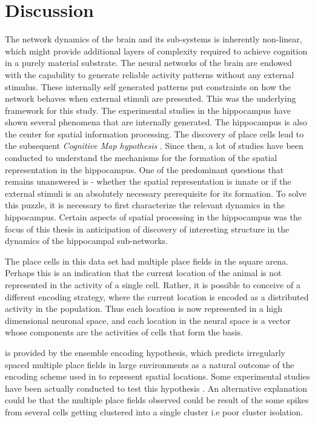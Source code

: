 \chapter{Discussion}

The network dynamics of the brain and its sub-systems is inherently non-linear, which might provide additional layers of complexity required to achieve cognition in a purely material substrate. The neural networks of the brain are endowed with the capability to generate reliable activity patterns without any external stimulus. These internally self generated patterns put constraints on how the network behaves when external stimuli are presented. This was the underlying framework for this study. The experimental studies in the hippocampus have shown several phenomena that are internally generated. The hippocampus is also the center for spatial information processing. The discovery of place cells \cite{O'Keefe1971a} lead to the subsequent \emph{Cognitive Map hypothesis} \cite{Street}. Since then, a lot of studies have been conducted to understand the mechanisms for the formation of the spatial representation in the hippocampus. One of the predominant questions that remains unanswered is - whether the spatial representation is innate or if the external stimuli is an absolutely necessary prerequisite for its formation. To solve this puzzle, it is necessary to first characterize the relevant dynamics in the hippocampus. Certain aspects of spatial processing in the hippocampus was the focus of this thesis in anticipation of discovery of interesting structure in the dynamics of the hippocampal sub-networks. 

The place cells in this data set had multiple place fields in the square arena. Perhaps this is an indication that the current location of the animal is not represented in the activity of a single cell. Rather, it is possible to conceive of a different encoding strategy, where the current location is encoded as a distributed activity in the population. Thus each location is now represented in a high dimensional neuronal space, and each location in the neural space is a vector whose components are the activities of cells that form the basis. 


  is provided by the ensemble encoding hypothesis, which predicts irregularly spaced multiple place fields in large environments as a natural outcome of the encoding scheme used in to represent spatial locations. Some experimental studies have been actually conducted to test this hypothesis \cite{Fenton2008}.  An alternative explanation could be that the multiple place fields observed could be result of the some spikes from several cells getting clustered into a single cluster i.e poor cluster isolation.

